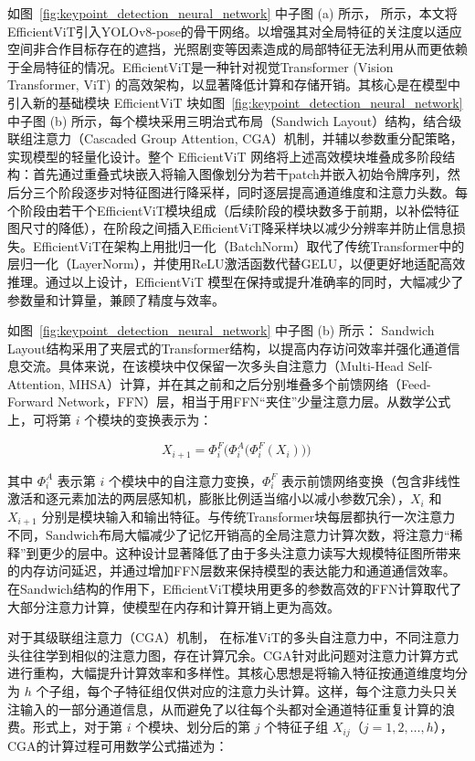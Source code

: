 如图~\ref{fig:keypoint_detection_neural_network} 中子图 (a) 所示， 所示，本文将EfficientViT引入YOLOv8-pose的骨干网络。以增强其对全局特征的关注度以适应空间非合作目标存在的遮挡，光照剧变等因素造成的局部特征无法利用从而更依赖于全局特征的情况。EfficientViT\cite{liu2023efficientvit}是一种针对视觉Transformer (Vision Transformer, ViT) 的高效架构，以显著降低计算和存储开销。其核心是在模型中引入新的基础模块 EfficientViT 块如图~\ref{fig:keypoint_detection_neural_network} 中子图 (b) 所示，每个模块采用三明治式布局（Sandwich Layout）结构，结合级联组注意力（Cascaded Group Attention, CGA）机制，并辅以参数重分配策略，实现模型的轻量化设计。整个 EfficientViT 网络将上述高效模块堆叠成多阶段结构：首先通过重叠式块嵌入将输入图像划分为若干patch并嵌入初始令牌序列，然后分三个阶段逐步对特征图进行降采样，同时逐层提高通道维度和注意力头数。每个阶段由若干个EfficientViT模块组成（后续阶段的模块数多于前期，以补偿特征图尺寸的降低），在阶段之间插入EfficientViT降采样块以减少分辨率并防止信息损失。EfficientViT在架构上用批归一化（BatchNorm）取代了传统Transformer中的层归一化（LayerNorm），并使用ReLU激活函数代替GELU，以便更好地适配高效推理。通过以上设计，EfficientViT 模型在保持或提升准确率的同时，大幅减少了参数量和计算量，兼顾了精度与效率。

如图~\ref{fig:keypoint_detection_neural_network} 中子图 (b) 所示： Sandwich Layout结构采用了夹层式的Transformer结构，以提高内存访问效率并强化通道信息交流。具体来说，在该模块中仅保留一次多头自注意力（Multi-Head Self-Attention, MHSA）计算，并在其之前和之后分别堆叠多个前馈网络（Feed-Forward Network，FFN）层，相当于用FFN“夹住”少量注意力层。从数学公式上，可将第 $i$ 个模块的变换表示为：

\begin{equation}\label{eq:sandwich}
	X_{i+1} = \Phi^F_i\Big(\Phi^A_i\big(\Phi^F_i(X_i)\big)\Big)\,
\end{equation}

其中 $\Phi^A_i$ 表示第 $i$ 个模块中的自注意力变换，$\Phi^F_i$ 表示前馈网络变换（包含非线性激活和逐元素加法的两层感知机，膨胀比例适当缩小以减小参数冗余），$X_i$ 和 $X_{i+1}$ 分别是模块输入和输出特征。与传统Transformer块每层都执行一次注意力不同，Sandwich布局大幅减少了记忆开销高的全局注意力计算次数，将注意力“稀释”到更少的层中。这种设计显著降低了由于多头注意力读写大规模特征图所带来的内存访问延迟，并通过增加FFN层数来保持模型的表达能力和通道通信效率。在Sandwich结构的作用下，EfficientViT模块用更多的参数高效的FFN计算取代了大部分注意力计算，使模型在内存和计算开销上更为高效。

对于其级联组注意力（CGA）机制， 在标准ViT的多头自注意力中，不同注意力头往往学到相似的注意力图，存在计算冗余。CGA针对此问题对注意力计算方式进行重构，大幅提升计算效率和多样性。其核心思想是将输入特征按通道维度均分为 $h$ 个子组，每个子特征组仅供对应的注意力头计算。这样，每个注意力头只关注输入的一部分通道信息，从而避免了以往每个头都对全通道特征重复计算的浪费。形式上，对于第 $i$ 个模块、划分后的第 $j$ 个特征子组 $X_{ij}$（$j=1,2,\dots,h$），CGA的计算过程可用数学公式描述为：

